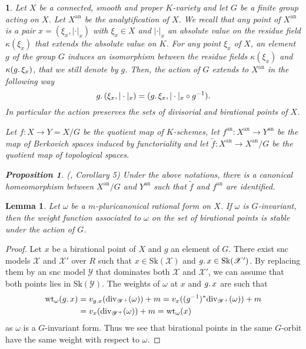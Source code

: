 \documentclass{amsart}%
\numberwithin{equation}{subsection}
\theoremstyle{plain2}
\newtheorem{lemma}[equation]{Lemma}
\newtheorem{prop}[equation]{Proposition}
\theoremstyle{definition2}
\theoremstyle{stepstyle}
\theoremstyle{point}
\theoremstyle{subpoint}
\newtheorem{subpoint}[equation]{}%
\newcommand{\spa}[1]{\begin{subpoint}#1\end{subpoint}}           %
\newcommand{\cX}{\ensuremath{\mathscr{X}}}
\newcommand{\cY}{\ensuremath{\mathscr{Y}}}
\renewcommand{\cY}{\ensuremath{\mathscr{Y}}}
\newcommand{\an}{\mathrm{an}}
\newcommand{\divisor}{\mathrm{div}}
\newcommand{\weight}{\mathrm{wt}}
\newcommand{\Sk}{\mathrm{Sk}}
\begin{document}
\spa{Let $X$ be a connected, smooth  and proper $K$-variety and let $G$ be a finite group acting on $X$. Let $X^{\an}$ be the analytification of $X$. We recall that any point of $X^{\an}$ is a pair $x=(\xi_x,|\cdot|_x)$ with $\xi_x \in X$ and $|\cdot|_x$ an absolute value on the residue field $\kappa(\xi_x)$ that extends the absolute value on $K$. For any point $\xi_x$ of $X$, an element $g$ of the group $G$ induces an isomorphism between the residue fields $\kappa(\xi_x)$ and $\kappa(g \ldotp \xi_x)$, that we still denote by $g$. Then, the action of $G$ extends to $X^\an$ in the following way $$g \ldotp (\xi_x,|\cdot|_x) = ( g \ldotp \xi_x,  |\cdot|_x \circ g^{-1}).$$ In particular the action preserves the sets of divisorial and birational points of $X$.

Let $f: X \rightarrow Y=X/G$ be the quotient map of $K$-schemes, let $f^\an: X^\an \rightarrow Y^\an$ be the map of Berkovich spaces induced by functoriality and let $\tilde{f}: X^\an \rightarrow X^\an/G$ be the quotient map of topological spaces.
\begin{prop} (\cite{Berkovich}, Corollary 5) \label{prop Berk identification of quotient}
Under the above notations, there is a canonical homeomorphism between $X^\an/G $ and $Y^\an$ such that $\tilde{f}$ and $f^\an$ are identified.
\end{prop}
}



\begin{lemma} \label{lemma G invariant forms and weight function}
Let $\omega$ be a $m$-pluricanonical rational form on $X$. If $\omega$ is $G$-invariant, then the weight function associated to $\omega$ on the set of birational points is stable under the action of $G$. 
\end{lemma}
\begin{proof}
Let $x$ be a birational point of $X$ and $g$ an element of $G$. There exist snc models $\cX$ and $\cX'$ over $R$ such that $x \in \Sk(\cX)$ and $g \ldotp x \in \Sk(\cX')$. By replacing them by an snc model $\cY$ that dominates both $\cX$ and $\cX'$, we can assume that both points lies in $\Sk(\cY)$. The weights of $\omega$ at $x$ and $g \ldotp x$ are such that \begin{align*} \weight_{\omega}(g \ldotp x)& = v_{g \ldotp x}(\divisor_{\cY^+}(\omega)) + m  = v_{x}((g^{-1})^*\divisor_{\cY^+}(\omega)) + m  \\ & = v_{x}(\divisor_{\cY^+}(\omega)) + m = \weight_{\omega}(x) \end{align*} as $\omega$ is a $G$-invariant form. Thus we see that birational points in the same $G$-orbit have the same weight with respect to $\omega$. 
\end{proof}
\end{document}
